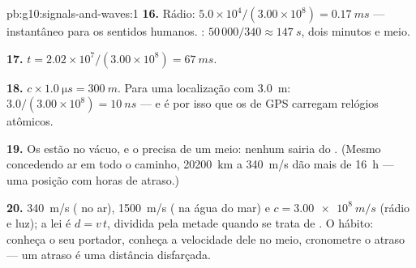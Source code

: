 \begin{solution}{pb:g10:signals-and-waves:1}
\textbf{16.} Rádio: $5.0\times10^{4}/(3.00\times10^{8}) =
\qty{0.17}{ms}$ --- instantâneo para os sentidos humanos. :
$50\,000/340 \approx \qty{147}{s}$, dois minutos e meio.

\textbf{17.} $t = 2.02\times10^{7}/(3.00\times10^{8}) = \qty{67}{ms}$.

\textbf{18.} $c \times \qty{1.0}{\micro s} = \qty{300}{m}$. Para uma
localização com \qty{3.0}{m}: $3.0/(3.00\times10^{8}) = \qty{10}{ns}$ ---
e é por isso que os  de GPS carregam relógios atômicos.

\textbf{19.} Os  estão no vácuo, e o  precisa de um meio:
 nenhum sairia do . (Mesmo concedendo ar em todo o caminho,
\qty{20200}{km} a \qty{340}{m/s} dão mais de \qty{16}{h} --- uma posição
com horas de atraso.)

\textbf{20.} \qty{340}{m/s} ( no ar), \qty{1500}{m/s} ( na água do
mar) e $c = \qty{3.00e8}{m/s}$ (rádio e luz); a lei é $d = v\,t$,
dividida pela metade quando se trata de . O hábito: conheça o seu
portador, conheça a velocidade dele no meio, cronometre o atraso --- um
atraso é uma distância disfarçada.
\end{solution}
